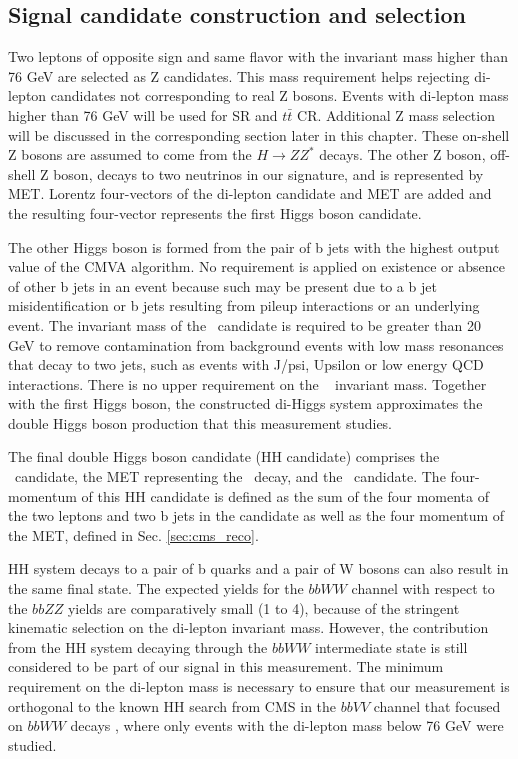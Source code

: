   
  
\subsection{Signal candidate construction and selection}

Two leptons of opposite sign and same flavor with the invariant mass higher than 76 GeV are selected as Z candidates. This mass requirement helps rejecting di-lepton candidates not corresponding to real Z bosons. Events with di-lepton mass higher than 76 GeV will be used for SR and $t\bar{t}$ CR. Additional Z mass selection will be discussed in the corresponding section later in this chapter. These on-shell Z bosons are assumed to come from the $H \to Z Z^*$ decays. The other Z boson, off-shell Z boson, decays to two neutrinos in our signature, and is represented by MET. Lorentz four-vectors of the di-lepton candidate and MET are added and the resulting four-vector represents the first Higgs boson candidate. 

The other Higgs boson is formed from the pair of b jets with the highest output value of the CMVA algorithm. No requirement is applied on existence or absence of other b jets in an event because such may be present due to a b jet misidentification or b jets resulting from pileup interactions or an underlying event. The invariant mass of the \HBB~candidate is required to be greater than 20 GeV to remove contamination from background events with low mass resonances that decay to two jets, such as events with J/psi, Upsilon or low energy QCD interactions. There is no upper requirement on the \HBB~ invariant mass. Together with the first Higgs boson, the constructed di-Higgs system approximates the double Higgs boson production that this measurement studies. 

The final double Higgs boson candidate (HH candidate) comprises the \Zll~candidate, the MET representing the \Znn~decay, and the \HBB~candidate. The four-momentum of this HH candidate is defined as the sum of the four momenta of the two leptons and two b jets in the candidate as well as the four momentum of the MET, defined in Sec. \ref{sec:cms_reco}.

HH system decays to a pair of b quarks and a pair of W bosons can also result in the same final state. The expected yields for the $bbWW$ channel with respect to the $bbZZ$ yields are comparatively small (1 to 4), because of the stringent kinematic selection on the di-lepton invariant mass. However, the contribution from the HH system decaying through the $bbWW$ intermediate state is still considered to be part of our signal in this measurement. The minimum requirement on the di-lepton mass is necessary to ensure that our measurement is orthogonal to the known HH search from CMS in the $bbVV$ channel that focused on $bbWW$ decays \cite{bbWW}, where only events with the di-lepton mass below 76 GeV were studied.

